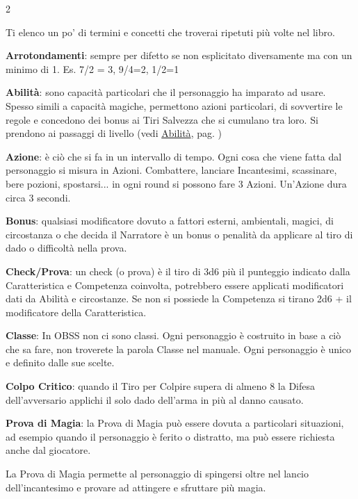 \begin{multicols}{2}

Ti elenco un po' di termini e concetti che troverai ripetuti più volte nel libro.

\medskip

\textbf{Arrotondamenti}: sempre per difetto se non esplicitato diversamente ma con un minimo di 1. Es. 7/2 = 3, 9/4=2, 1/2=1

\textbf{Abilità}: sono capacità particolari che il personaggio ha imparato ad usare. Spesso simili a capacità magiche, permettono azioni particolari, di sovvertire le regole e concedono dei bonus ai Tiri Salvezza che si cumulano tra loro. Si prendono ai passaggi di livello (vedi \hyperlink{abilita}{Abilità}, pag. \pageref{abilita})

\textbf{Azione}:  è ciò che si fa in un intervallo di tempo. Ogni cosa che viene fatta dal personaggio si misura in Azioni. Combattere, lanciare Incantesimi, scassinare, bere pozioni, spostarsi... in ogni round si possono fare 3 Azioni. Un'Azione dura circa 3 secondi.

\textbf{Bonus}: qualsiasi modificatore dovuto a fattori esterni, ambientali, magici, di circostanza o che decida il Narratore è un bonus o penalità da applicare al tiro di dado o difficoltà nella prova.

\textbf{Check/Prova}: un check (o prova) è il tiro di 3d6 più il punteggio indicato dalla Caratteristica e Competenza coinvolta, potrebbero essere applicati modificatori dati da Abilità e circostanze. Se non si possiede la Competenza si tirano 2d6 + il modificatore della Caratteristica.

\textbf{Classe}: In OBSS non ci sono classi. Ogni personaggio è costruito in base a ciò che sa fare, non troverete la parola Classe nel manuale. Ogni personaggio è unico e definito dalle sue scelte.

\textbf{Colpo Critico}: quando il Tiro per Colpire supera di almeno 8 la Difesa dell'avversario applichi il solo dado dell'arma in più al danno causato.

\textbf{Prova di Magia}: la Prova di Magia può essere dovuta a particolari situazioni, ad esempio quando il personaggio è ferito o distratto, ma può essere richiesta anche dal giocatore.

La Prova di Magia permette al personaggio di spingersi oltre nel lancio dell'incantesimo e provare ad attingere e sfruttare più magia.


\end{multicols}
